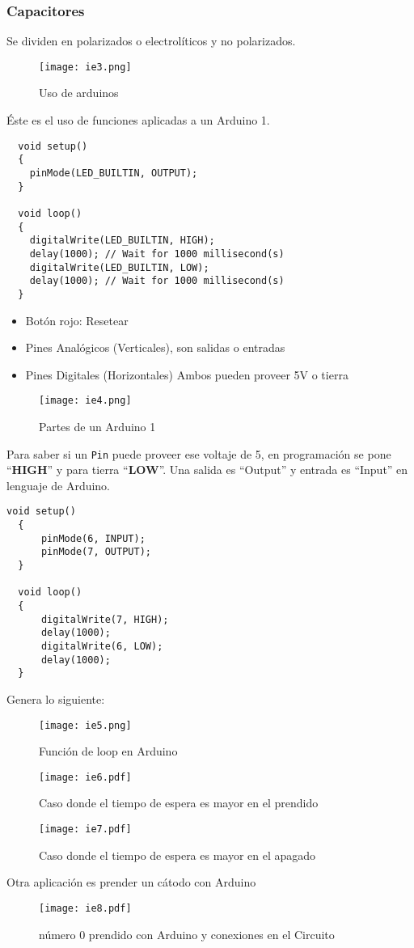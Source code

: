 \subsubsection{Capacitores}
Se dividen en polarizados o electrolíticos y no polarizados.
\begin{figure}[h!]
  \centering
    \texttt{[image: ie3.png]}
    \caption{Uso de arduinos}
    \label{ei3}
\end{figure}
  Éste es el uso de funciones aplicadas a un Arduino 1.
\begin{lstlisting}
  void setup()
  {
    pinMode(LED_BUILTIN, OUTPUT);
  }
  
  void loop()
  {
    digitalWrite(LED_BUILTIN, HIGH);
    delay(1000); // Wait for 1000 millisecond(s)
    digitalWrite(LED_BUILTIN, LOW);
    delay(1000); // Wait for 1000 millisecond(s)
  }
\end{lstlisting}
\begin{itemize}
  \item Botón rojo: Resetear
  \item Pines Analógicos (Verticales), son salidas o entradas
  \item Pines Digitales (Horizontales) Ambos pueden proveer 5V o tierra
\end{itemize}
\begin{figure}[h!]
\centering
\texttt{[image: ie4.png]}
\caption{Partes de un Arduino 1}
\label{ie4}
\end{figure}
Para saber si un \texttt{Pin} puede proveer ese voltaje de 5, en programación se pone ``\textbf{HIGH}'' y para tierra ``\textbf{LOW}''. Una salida es ``Output'' y entrada es ``Input'' en lenguaje de Arduino.

\begin{lstlisting}[style=pythonFrameTB]
  void setup()
  {
      pinMode(6, INPUT);
      pinMode(7, OUTPUT);
  }
  
  void loop()
  {
      digitalWrite(7, HIGH);
      delay(1000);
      digitalWrite(6, LOW);
      delay(1000);
  }
\end{lstlisting}

Genera lo siguiente:
\begin{figure}[h!]
\centering
\texttt{[image: ie5.png]}
\caption{Función de loop en Arduino}
\label{ie5}
\end{figure}
\begin{figure}[h!]
\centering
\texttt{[image: ie6.pdf]}
\caption{Caso donde el tiempo de espera es mayor en el prendido}
\label{ie6}
\end{figure}
\begin{figure}[h!]
\centering
\texttt{[image: ie7.pdf]}
\caption{Caso donde el tiempo de espera es mayor en el apagado}
\label{ie7}
\end{figure}
Otra aplicación es prender un cátodo con Arduino
\begin{figure}[h!]
\centering
\texttt{[image: ie8.pdf]}
\caption{número 0 prendido con Arduino y conexiones en el Circuito}
\label{ie8}
\end{figure}


